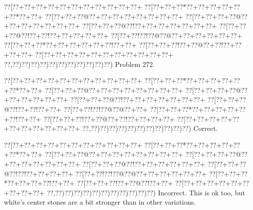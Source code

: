 \documentclass[a5paper]{article}
\begin{document}
\newpage
\begin{center}
{\goo
\0??[\0??+\0??+\0??+\0??+\0??+\0??+\0??+\0??+\0??+\0??+\0??+
\0??[\0??+\0??+\0??*\0??+\0??+\0??+\0??+\0??+\0??*\0??+\0??+
\0??[\0??+\0??+\0??@\0??+\0??+\0??+\0??+\0??+\0??+\0??+\0??+
\0??[\0??+\0??+\0??+\0??@\0??+\0??+\0??+\0??+\0??+\0??+\0??+
\0??[\0??+\0??+\0??@\0??!\0??+\0??+\0??+\0??+\0??+\0??+\0??+
\0??[\0??+\0??+\0??@\0??!\0??+\0??!\0??+\0??+\0??+\0??+\0??+
\0??[\0??+\0??!\0??!\0??@\0??@\0??+\0??+\0??+\0??+\0??+\0??+
\0??[\0??+\0??+\0??*\0??+\0??+\0??+\0??+\0??+\0??!\0??+\0??+
\0??[\0??+\0??+\0??!\0??+\0??@\0??+\0??!\0??+\0??+\0??+\0??+
\0??[\0??+\0??+\0??+\0??+\0??+\0??+\0??+\0??+\0??+\0??+\0??+
\0??,\0??)\0??)\0??)\0??)\0??)\0??)\0??)\0??)\0??)\0??)\0??)
}
Problem 272.

\end{center}
\begin{center}
{\goo
\0??[\0??+\0??+\0??+\0??+\0??+\0??+\0??+\0??+\0??+\0??+\0??+
\0??[\0??+\0??+\0??*\0??+\0??+\0??+\0??+\0??+\0??*\0??+\0??+
\0??[\0??+\0??+\0??@\0??+\0??+\0??+\0??+\0??+\0??+\0??+\0??+
\0??[\0??+\0??+\0??+\0??@\0??+\0??+\0??+\0??+\0??+\0??+
\0??[\0??+\0??+\0??@\0??!\0??+\0??+\0??+\0??+\0??+\0??+\0??+
\0??[\0??+\0??+\0??@\0??!\0??+\0??!\0??+\0??+
\0??[\0??+\0??!\0??!\0??@\0??@\0??+\0??+
\0??[\0??+\0??+\0??*\0??+\0??+\0??+\0??+\0??+\0??!\0??+\0??+
\0??[\0??+\0??+\0??!\0??+\0??@\0??+\0??!\0??+\0??+\0??+\0??+
\0??[\0??+\0??+\0??+\0??+\0??+\0??+\0??+\0??+\0??+\0??+\0??+
\0??,\0??)\0??)\0??)\0??)\0??)\0??)\0??)\0??)\0??)\0??)\0??)
}
Correct. 

\end{center}
\begin{center}
{\goo
\0??[\0??+\0??+\0??+\0??+\0??+\0??+\0??+\0??+\0??+\0??+\0??+
\0??[\0??+\0??+\0??*\0??+\0??+\0??+\0??+\0??+\0??*\0??+\0??+
\0??[\0??+\0??+\0??@\0??+\0??+\0??+\0??+\0??+\0??+\0??+\0??+
\0??[\0??+\0??+\0??+\0??@\0??+\0??+\0??+\0??+\0??+\0??+\0??+
\0??[\0??+\0??+\0??@\0??!\0??+\0??+\0??+\0??+\0??+\0??+
\0??[\0??+\0??+\0??@\0??!\0??!\0??+\0??+\0??+\0??+
\0??[\0??+\0??!\0??!\0??@\0??@\0??+\0??+\0??+\0??+\0??+\0??+
\0??[\0??+\0??+\0??*\0??+\0??+\0??+\0??!\0??+\0??+
\0??[\0??+\0??+\0??!\0??+\0??@\0??!\0??+\0??+
\0??[\0??+\0??+\0??+\0??+\0??+\0??+\0??+\0??+\0??+
\0??,\0??)\0??)\0??)\0??)\0??)\0??)\0??)\0??)\0??)\0??)\0??)
}
Incorrect. This is ok too, but white's center stones are a bit stronger than in other variations.

\end{center}
\end{document}

